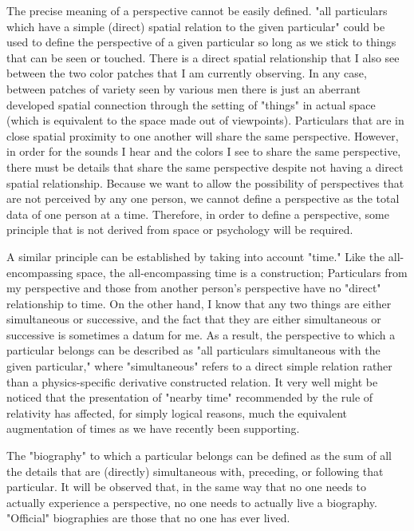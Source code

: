 \documentclass[a4paper,12pt]{book}[2004/02/16]
\theoremstyle{ilemma}
\theoremstyle{itheorem}
\theoremstyle{iother}
\theoremstyle{icorollary}
\theoremstyle{numcorollary}
\theoremstyle{idefinition}
\begin{document}
The precise meaning of a perspective cannot be easily defined. "all particulars which have a simple (direct) spatial relation to the given particular" could be used to define the perspective of a given particular so long as we stick to things that can be seen or touched. There is a direct spatial relationship that I also see between the two color patches that I am currently observing. In any case, between patches of
variety seen by various men there is just an aberrant developed
spatial connection through the setting of "things" in actual space
(which is equivalent to the space made out of viewpoints). Particulars that are in close spatial proximity to one another will share the same perspective. However, in order for the sounds I hear and the colors I see to share the same perspective, there must be details that share the same perspective despite not having a direct spatial relationship. Because we want to allow the possibility of perspectives that are not perceived by any one person, we cannot define a perspective as the total data of one person at a time. Therefore, in order to define a perspective, some principle that is not derived from space or psychology will be required.

A similar principle can be established by taking into account "time."
Like the all-encompassing space, the all-encompassing time is a construction; Particulars from my perspective and those from another person's perspective have no "direct" relationship to time. On the other hand, I know that any two things are either simultaneous or successive, and the fact that they are either simultaneous or successive is sometimes a datum for me. As a result, the perspective to which a particular belongs can be described as "all particulars simultaneous with the given particular," where "simultaneous" refers to a direct simple relation rather than a physics-specific derivative constructed relation. It very well might be noticed
that the presentation of "nearby time" recommended by the rule of
relativity has affected, for simply logical reasons, much the equivalent
augmentation of times as we have recently been supporting.

The "biography" to which a particular belongs can be defined as the sum of all the details that are (directly) simultaneous with, preceding, or following that particular. It will be observed that, in the same way that no one needs to actually experience a perspective, no one needs to actually live a biography. "Official" biographies are those that no one has ever lived.
\end{document}
